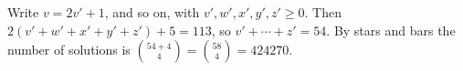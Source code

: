 Write $v=2v'+1$, and so on, with $v',w',x',y',z'\ge0$. Then $2(v'+w'+x'+y'+z')+5=113$, so $v'+\cdots+z'=54$. By stars and bars the number of solutions is $\binom{54+4}4=\binom{58}4=\boxed{424270}$.
